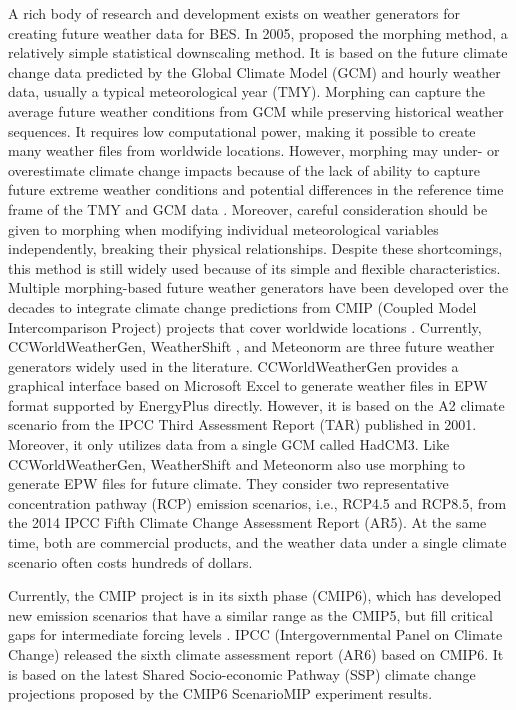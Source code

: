 \documentclass[twocolumn, a4paper,10pt]{article}
\begin{document}
A rich body of research and development exists on weather generators for
creating future weather data for BES. In 2005, \citet{belcher2005constructing} proposed
the morphing method, a relatively simple statistical downscaling
method. It is based on the future climate change data predicted by the Global
Climate Model (GCM) and hourly weather data, usually a typical meteorological
year (TMY). Morphing can capture the average future weather conditions from GCM
while preserving historical weather sequences. It requires low computational
power, making it possible to create many weather files from worldwide locations.
However, morphing may under- or overestimate climate change impacts because of
the lack of ability to capture future extreme weather conditions and
potential differences in the reference time frame of the TMY and GCM data
\citep{moazami2019impacts}.
Moreover, careful consideration should be given to morphing when modifying
individual meteorological variables independently, breaking their physical
relationships. Despite these shortcomings, this method is still widely used
because of its simple and flexible characteristics.
Multiple morphing-based future weather
generators have been developed over the decades to integrate climate change
predictions from CMIP (Coupled Model Intercomparison Project) projects that
cover worldwide locations \citep{jentsch2008climate, troup2016morphing, dickinson2016generating, yassaghi2019overview}. Currently,
CCWorldWeatherGen\citep{jentsch2013transforming}, WeatherShift
\citep{dickinson2016generating}, and Meteonorm \citep{remund2020meteonorm} are three
future weather generators widely used in the literature. CCWorldWeatherGen provides
a graphical interface based on Microsoft Excel to generate weather files in EPW
format supported by EnergyPlus directly. However, it is based on the A2 climate
scenario from the IPCC Third Assessment Report (TAR) published in 2001. Moreover,
it only utilizes data from a single GCM called HadCM3. Like CCWorldWeatherGen,
WeatherShift and Meteonorm also use morphing to generate EPW files for future
climate. They consider two representative concentration pathway (RCP) emission
scenarios, i.e., RCP4.5 and RCP8.5, from the 2014 IPCC Fifth Climate Change
Assessment Report (AR5). At the same time, both are commercial products, and the
weather data under a single climate scenario often costs hundreds of dollars.

Currently, the CMIP project is in its sixth phase (CMIP6), which has developed
new emission scenarios that have a similar range as the CMIP5, but fill critical
gaps for intermediate forcing levels \citep{oneill2016scenario}. IPCC
(Intergovernmental Panel on Climate Change) released the sixth climate
assessment report (AR6) based on CMIP6. It is based on the latest Shared
Socio-economic Pathway (SSP) climate change projections proposed by the CMIP6
ScenarioMIP experiment results.
\end{document}
